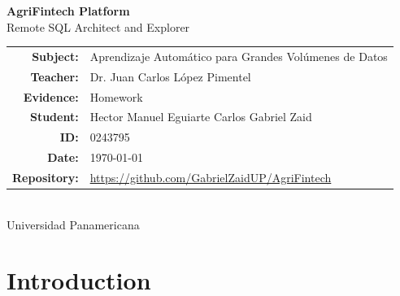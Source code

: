 \documentclass[12pt, a4paper]{article}
\begin{document}
\begin{titlepage}
  \centering
  \vspace*{2cm}

  {\Huge\bfseries\color{agrigreen} AgriFintech Platform}\\[0.4em]
  {\large\color{mutedgray} Remote SQL Architect and Explorer}\\[2.5cm]

  \begin{tabular}{rl}
    \textbf{Subject:}   & Aprendizaje Automático para Grandes Volúmenes de Datos \\[4pt]
    \textbf{Teacher:}   & Dr. Juan Carlos López Pimentel \\[4pt]
    \textbf{Evidence:}  & Homework \\[4pt]
    \textbf{Student:}   & Hector Manuel Eguiarte Carlos \n Gabriel Zaid \\[4pt]
    \textbf{ID:}        & 0243795 \n 0243795 \\[4pt]
    \textbf{Date:}      & \today \\[4pt]
    \textbf{Repository:} & \url{https://github.com/GabrielZaidUP/AgriFintech} \\
  \end{tabular}

  \vfill

  \fbox{%
    \begin{minipage}{5cm}
      \centering
      \vspace{1.2cm}
      \textcolor{mutedgray}{\faUniversity\quad University Logo}
      \vspace{1.2cm}
    \end{minipage}
  }\\[1em]
  {\small\textcolor{mutedgray}{Universidad Panamericana}}

\end{titlepage}

\tableofcontents
\newpage

\section{Introduction}
\end{document}

